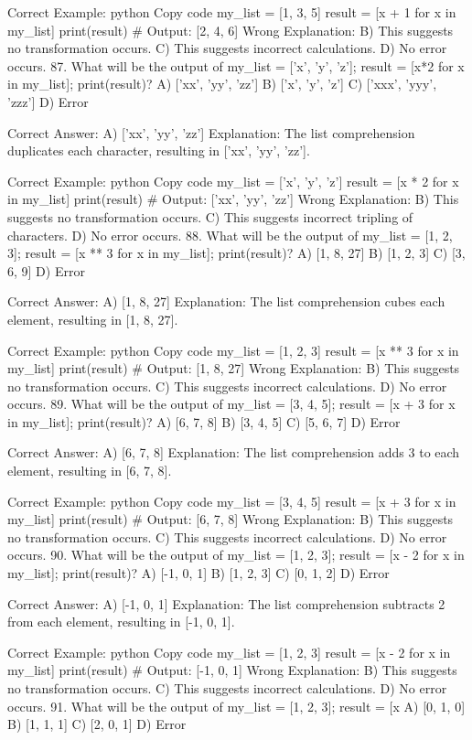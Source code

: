 Correct Example:
python
Copy code
my_list = [1, 3, 5]
result = [x + 1 for x in my_list]
print(result)  # Output: [2, 4, 6]
Wrong Explanation:
B) This suggests no transformation occurs.
C) This suggests incorrect calculations.
D) No error occurs.
87. What will be the output of my_list = ['x', 'y', 'z']; result = [x*2 for x in my_list]; print(result)?
A) ['xx', 'yy', 'zz']
B) ['x', 'y', 'z']
C) ['xxx', 'yyy', 'zzz']
D) Error

Correct Answer: A) ['xx', 'yy', 'zz']
Explanation: The list comprehension duplicates each character, resulting in ['xx', 'yy', 'zz'].

Correct Example:
python
Copy code
my_list = ['x', 'y', 'z']
result = [x * 2 for x in my_list]
print(result)  # Output: ['xx', 'yy', 'zz']
Wrong Explanation:
B) This suggests no transformation occurs.
C) This suggests incorrect tripling of characters.
D) No error occurs.
88. What will be the output of my_list = [1, 2, 3]; result = [x ** 3 for x in my_list]; print(result)?
A) [1, 8, 27]
B) [1, 2, 3]
C) [3, 6, 9]
D) Error

Correct Answer: A) [1, 8, 27]
Explanation: The list comprehension cubes each element, resulting in [1, 8, 27].

Correct Example:
python
Copy code
my_list = [1, 2, 3]
result = [x ** 3 for x in my_list]
print(result)  # Output: [1, 8, 27]
Wrong Explanation:
B) This suggests no transformation occurs.
C) This suggests incorrect calculations.
D) No error occurs.
89. What will be the output of my_list = [3, 4, 5]; result = [x + 3 for x in my_list]; print(result)?
A) [6, 7, 8]
B) [3, 4, 5]
C) [5, 6, 7]
D) Error

Correct Answer: A) [6, 7, 8]
Explanation: The list comprehension adds 3 to each element, resulting in [6, 7, 8].

Correct Example:
python
Copy code
my_list = [3, 4, 5]
result = [x + 3 for x in my_list]
print(result)  # Output: [6, 7, 8]
Wrong Explanation:
B) This suggests no transformation occurs.
C) This suggests incorrect calculations.
D) No error occurs.
90. What will be the output of my_list = [1, 2, 3]; result = [x - 2 for x in my_list]; print(result)?
A) [-1, 0, 1]
B) [1, 2, 3]
C) [0, 1, 2]
D) Error

Correct Answer: A) [-1, 0, 1]
Explanation: The list comprehension subtracts 2 from each element, resulting in [-1, 0, 1].

Correct Example:
python
Copy code
my_list = [1, 2, 3]
result = [x - 2 for x in my_list]
print(result)  # Output: [-1, 0, 1]
Wrong Explanation:
B) This suggests no transformation occurs.
C) This suggests incorrect calculations.
D) No error occurs.
91. What will be the output of my_list = [1, 2, 3]; result = [x %
A) [0, 1, 0]
B) [1, 1, 1]
C) [2, 0, 1]
D) Error

